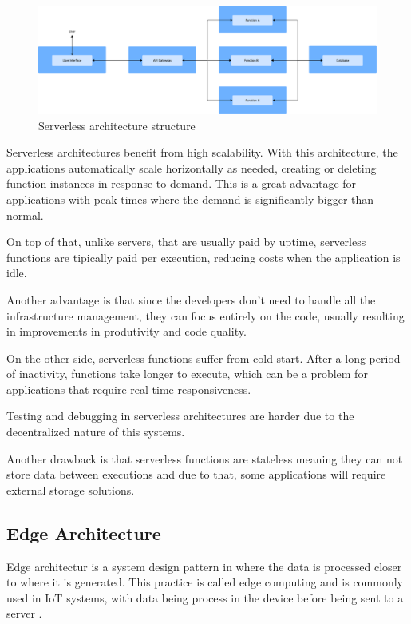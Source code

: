 \begin{figure}[htbp]
	\centering
	\includegraphics[width=\textwidth, height=0.5\textheight, keepaspectratio]{Chapters/Figures/Architectures/Serverless.pdf}
	\caption{Serverless architecture structure}
	\label{fig:architectures:serverless}
\end{figure}

Serverless architectures benefit from high scalability. With this
architecture, the applications automatically scale horizontally as needed, creating or
deleting function instances in response to demand. This is a great
advantage for applications with peak times where the demand is
significantly bigger than normal\cite{GoogleServerless}.

On top of that, unlike servers, that are usually paid by uptime, serverless functions are
tipically paid per execution, reducing costs when the application is idle\cite{s23104868}.

Another advantage is that since the developers don't need to handle all the infrastructure management,
they can focus entirely on the code, usually resulting in improvements in
produtivity and code quality\cite{GoogleServerless}.

On the other side, serverless functions suffer from cold start. After a long
period of inactivity, functions take longer to execute, which
can be a problem for applications that require real-time responsiveness\cite{s21030928}.

Testing and debugging in serverless architectures are harder due to the
decentralized nature of this systems\cite{meghla2023testing}.

Another drawback is that serverless functions are stateless meaning they
can not store data between executions and due to that, some
applications will require external storage solutions\cite{meghla2023testing}.

\subsection{Edge Architecture}
Edge architectur is a system design pattern in where the data is processed
closer to where it is generated. This practice is called edge computing and
is commonly used in \gls{IoT} systems, with data being process in the device
before being sent to a server \cite{s20226441}.

